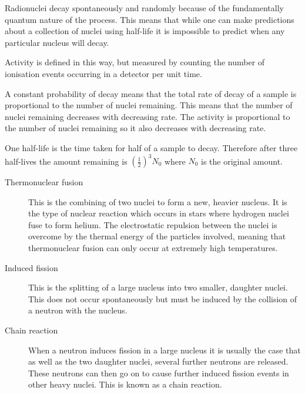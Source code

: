\documentclass[revision-guide.tex]{subfiles}
\begin{document}

Radionuclei decay spontaneously and randomly because of the fundamentally quantum nature of the process. This means that while one can make predictions about a collection of nuclei using half-life it is impossible to predict when any particular nucleus will decay.


Activity is defined in this way, but measured by counting the number of ionisation events occurring in a detector per unit time.


A constant probability of decay means that the total rate of decay of a sample is proportional to the number of nuclei remaining. This means that the number of nuclei remaining decreases with decreasing rate. The activity is proportional to the number of nuclei remaining so it also decreases with decreasing rate.


One half-life is the time taken for half of a sample to decay. Therefore after three half-lives the amount remaining is $\left(\frac{1}{2}\right)^3 N_0$ where $N_0$ is the original amount.


\begin{description}
  \item[Thermonuclear fusion] This is the combining of two nuclei to form a new, heavier nucleus. It is the type of nuclear reaction which occurs in stars where hydrogen nuclei fuse to form helium. The electrostatic repulsion between the nuclei is overcome by the thermal energy of the particles involved,  meaning that thermonuclear fusion can only occur at extremely high temperatures.
  \item[Induced fission] This is the splitting of a large nucleus into two smaller, daughter nuclei. This does not occur spontaneously but must be induced by the collision of a neutron with the nucleus.
  \newpage
  \item[Chain reaction] When a neutron induces fission in a large nucleus it is usually the case that as well as the two daughter nuclei, several further neutrons are released. These neutrons can then go on to cause further induced fission events in other heavy nuclei. This is known as a chain reaction.
\end{description}
\end{document}
